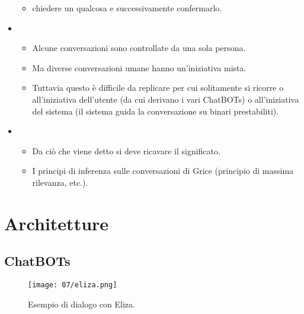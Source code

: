 \begin{itemize}
\begin{itemize}
    \item {} chiedere un qualcosa e successivamente confermarlo.
    \end{itemize}
  \item {}
    \begin{itemize}
      \item Alcune conversazioni sono controllate da una sola persona. 
      \item Ma diverse conversazioni umane hanno un'iniziativa mista. 
      \item Tuttavia questo è difficile da replicare per cui solitamente si ricorre o all'iniziativa dell'utente (da cui derivano i vari ChatBOTs) o all'iniziativa del sistema (il sistema guida la conversazione su binari prestabiliti). 
    \end{itemize}
  \item {}
    \begin{itemize}
      \item Da ciò che viene detto si deve ricavare il significato. 
      \item I principi di inferenza sulle conversazioni di Grice (principio di massima rilevanza, etc.).
    \end{itemize}
\end{itemize}

\section{Architetture}

\subsection{ChatBOTs}




\begin{figure}[h]
    \centering
    \texttt{[image: 07/eliza.png]}
    \caption{Esempio di dialogo con Eliza.}
\end{figure}


